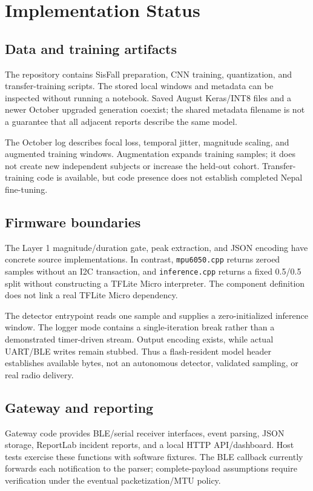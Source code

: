 \chapter{Implementation Status}
\section{Data and training artifacts}
The repository contains SisFall preparation, CNN training, quantization, and transfer-training scripts. The stored local windows and metadata can be inspected without running a notebook. Saved August Keras/INT8 files and a newer October upgraded generation coexist; the shared metadata filename is not a guarantee that all adjacent reports describe the same model.

The October log describes focal loss, temporal jitter, magnitude scaling, and augmented training windows. Augmentation expands training samples; it does not create new independent subjects or increase the held-out cohort. Transfer-training code is available, but code presence does not establish completed Nepal fine-tuning.

\section{Firmware boundaries}
The Layer 1 magnitude/duration gate, peak extraction, and JSON encoding have concrete source implementations. In contrast, \texttt{mpu6050.cpp} returns zeroed samples without an I2C transaction, and \texttt{inference.cpp} returns a fixed 0.5/0.5 split without constructing a TFLite Micro interpreter. The component definition does not link a real TFLite Micro dependency.

The detector entrypoint reads one sample and supplies a zero-initialized inference window. The logger mode contains a single-iteration break rather than a demonstrated timer-driven stream. Output encoding exists, while actual UART/BLE writes remain stubbed. Thus a flash-resident model header establishes available bytes, not an autonomous detector, validated sampling, or real radio delivery.


\section{Gateway and reporting}
Gateway code provides BLE/serial receiver interfaces, event parsing, JSON storage, ReportLab incident reports, and a local HTTP API/dashboard. Host tests exercise these functions with software fixtures. The BLE callback currently forwards each notification to the parser; complete-payload assumptions require verification under the eventual packetization/MTU policy.


